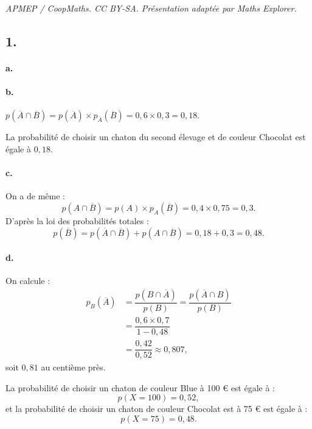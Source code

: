 \documentclass[10pt]{article}
\begin{document}
\noindent\textit{APMEP / CoopMaths. CC BY-SA. Présentation adaptée par Maths Explorer.}\par\medskip
\subsection*{1.}

\paragraph{a.}

\begin{center}
\end{center}

\paragraph{b.} \(p(\overline{A} \cap \overline{B}) = p(\overline{A}) \times p_{\overline{A}}(\overline{B}) = 0{,}6 \times 0{,}3 = 0{,}18\).

La probabilité de choisir un chaton du second élevage et de couleur Chocolat est égale à \(0{,}18\).

\paragraph{c.} On a de même :
\[
p(A \cap \overline{B}) = p(A) \times p_A(\overline{B}) = 0{,}4 \times 0{,}75 = 0{,}3.
\]
D'après la loi des probabilités totales :
\[
p(\overline{B}) = p(\overline{A} \cap \overline{B}) + p(A \cap \overline{B}) = 0{,}18 + 0{,}3 = 0{,}48.
\]

\paragraph{d.} On calcule :
\begin{align*}
p_B(\overline{A}) &= \dfrac{p(B \cap \overline{A})}{p(B)} = \dfrac{p(\overline{A} \cap B)}{p(B)} \\
&= \dfrac{0{,}6 \times 0{,}7}{1 - 0{,}48} \\
&= \dfrac{0{,}42}{0{,}52} \approx 0{,}807,
\end{align*}
soit \(0{,}81\) au centième près.

La probabilité de choisir un chaton de couleur Blue à 100 € est égale à :
\[
p(X = 100) = 0{,}52,
\]
et la probabilité de choisir un chaton de couleur Chocolat est à 75 € est égale à :
\[
p(X = 75) = 0{,}48.
\]
\end{document}
